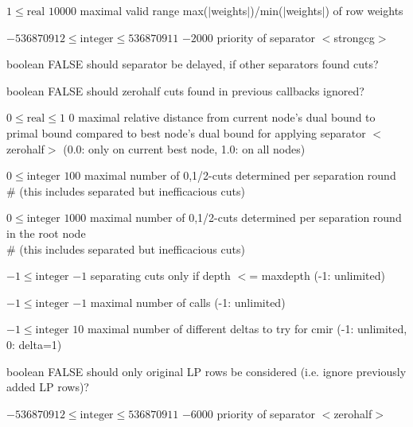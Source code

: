%
{$1\leq\textrm{real}$}%
{$10000$}%
{maximal valid range max($|$weights$|$)/min($|$weights$|$) of row weights}%
{}

%
{$-536870912\leq\textrm{integer}\leq536870911$}%
{$-2000$}%
{priority of separator $<$strongcg$>$}%
{}

%
{boolean}%
{FALSE}%
{should separator be delayed, if other separators found cuts?}%
{}

%
{boolean}%
{FALSE}%
{should zerohalf cuts found in previous callbacks ignored?}%
{}

%
{$0\leq\textrm{real}\leq1$}%
{$0$}%
{maximal relative distance from current node's dual bound to primal bound compared to best node's dual bound for applying separator $<$zerohalf$>$ (0.0: only on current best node, 1.0: on all nodes)}%
{}

%
{$0\leq\textrm{integer}$}%
{$100$}%
{maximal number of {0,1/2}-cuts determined per separation round \\   \#                      (this includes separated but inefficacious cuts)}%
{}

%
{$0\leq\textrm{integer}$}%
{$1000$}%
{maximal number of {0,1/2}-cuts determined per separation round in the root node\\   \#                      (this includes separated but inefficacious cuts)}%
{}

%
{$-1\leq\textrm{integer}$}%
{$-1$}%
{separating cuts only if depth $<$= maxdepth (-1: unlimited)}%
{}

%
{$-1\leq\textrm{integer}$}%
{$-1$}%
{maximal number of calls (-1: unlimited)}%
{}

%
{$-1\leq\textrm{integer}$}%
{$10$}%
{maximal number of different deltas to try for cmir (-1: unlimited, 0: delta=1)}%
{}

%
{boolean}%
{FALSE}%
{should only original LP rows be considered (i.e. ignore previously added LP rows)?}%
{}

%
{$-536870912\leq\textrm{integer}\leq536870911$}%
{$-6000$}%
{priority of separator $<$zerohalf$>$}%
{}

